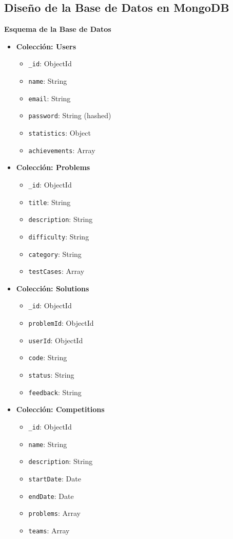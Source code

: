 \subsection{Diseño de la Base de Datos en MongoDB}

\textbf{Esquema de la Base de Datos}

\begin{itemize}
    \item \textbf{Colección: Users}
    \begin{itemize}
        \item \texttt{\_id}: ObjectId
        \item \texttt{name}: String
        \item \texttt{email}: String
        \item \texttt{password}: String (hashed)
        \item \texttt{statistics}: Object
        \item \texttt{achievements}: Array
    \end{itemize}

    \item \textbf{Colección: Problems}
    \begin{itemize}
        \item \texttt{\_id}: ObjectId
        \item \texttt{title}: String
        \item \texttt{description}: String
        \item \texttt{difficulty}: String
        \item \texttt{category}: String
        \item \texttt{testCases}: Array
    \end{itemize}

    \item \textbf{Colección: Solutions}
    \begin{itemize}
        \item \texttt{\_id}: ObjectId
        \item \texttt{problemId}: ObjectId
        \item \texttt{userId}: ObjectId
        \item \texttt{code}: String
        \item \texttt{status}: String
        \item \texttt{feedback}: String
    \end{itemize}

    \item \textbf{Colección: Competitions}
    \begin{itemize}
        \item \texttt{\_id}: ObjectId
        \item \texttt{name}: String
        \item \texttt{description}: String
        \item \texttt{startDate}: Date
        \item \texttt{endDate}: Date
        \item \texttt{problems}: Array
        \item \texttt{teams}: Array
    \end{itemize}
    

\end{itemize}
